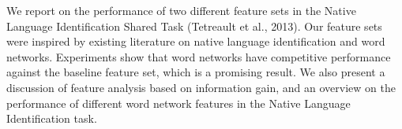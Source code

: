 We report on the performance of two different feature sets in the Native Language Identification Shared Task (Tetreault et al., 2013). Our feature sets
 were inspired by existing literature on native language identification and word
 networks. Experiments show that word networks have competitive performance
 against the baseline feature set, which is a promising result. We also present
 a discussion of feature analysis based on information gain, and an overview on
 the performance of different word network features in the Native Language
 Identification task.

